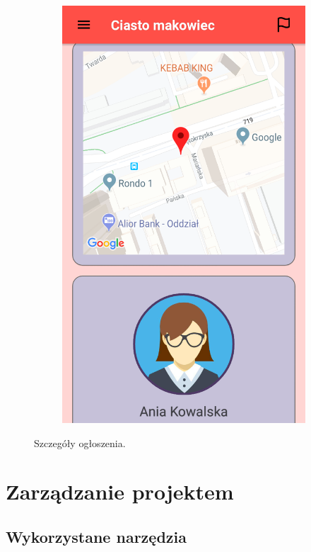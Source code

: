 \documentclass[licencjacka]{pracamgr}
\begin{document}
\begin{figure}[H]
\begin{subfigure}[b]{0.4\linewidth}
\begin{framed}
      \includegraphics[width=\linewidth]{szczegoly2.png}
    \end{framed}
  \end{subfigure}
  \caption{Szczegóły ogłoszenia.}
  \label{fig:offerdetails}
\end{figure}

\chapter{Zarządzanie projektem}\label{r:zarzadzanieProjektem}
\section{Wykorzystane narzędzia}
\end{document}
